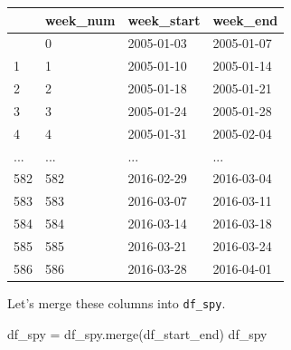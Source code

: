 \documentclass[
  letterpaper,
  DIV=11,
  numbers=noendperiod]{scrreprt}
\newenvironment{Shaded}{\begin{snugshade}}{\end{snugshade}}
\newcommand{\NormalTok}[1]{\textcolor[rgb]{0.00,0.23,0.31}{#1}}
\newcommand{\OperatorTok}[1]{\textcolor[rgb]{0.37,0.37,0.37}{#1}}
\begin{document}
\begin{longtable}[]{@{}llll@{}}
\toprule\noalign{}
& week\_num & week\_start & week\_end \\
\midrule\noalign{}
\endhead
\bottomrule\noalign{}
\endlastfoot
0 & 0 & 2005-01-03 & 2005-01-07 \\
1 & 1 & 2005-01-10 & 2005-01-14 \\
2 & 2 & 2005-01-18 & 2005-01-21 \\
3 & 3 & 2005-01-24 & 2005-01-28 \\
4 & 4 & 2005-01-31 & 2005-02-04 \\
... & ... & ... & ... \\
582 & 582 & 2016-02-29 & 2016-03-04 \\
583 & 583 & 2016-03-07 & 2016-03-11 \\
584 & 584 & 2016-03-14 & 2016-03-18 \\
585 & 585 & 2016-03-21 & 2016-03-24 \\
586 & 586 & 2016-03-28 & 2016-04-01 \\
\end{longtable}

Let's merge these columns into \texttt{df\_spy}.

\begin{Shaded}
\begin{Highlighting}[]
\NormalTok{df\_spy }\OperatorTok{=}\NormalTok{ df\_spy.merge(df\_start\_end)}
\NormalTok{df\_spy}
\end{Highlighting}
\end{Shaded}
\end{document}
